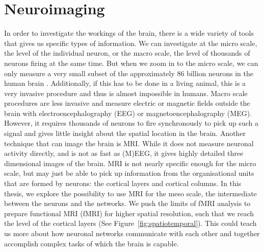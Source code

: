 \section*{Neuroimaging}
In order to investigate the workings of the brain, there is a wide variety of tools that gives us specific types of information. We can investigate at the micro scale, the level of the individual neuron, or the macro scale, the level of thousands of neurons firing at the same time. But when we zoom in to the micro scale, we can only measure a very small subset of the approximately 86 billion neurons in the human brain \cite{Herculano-Houzel2009}. Additionally, if this has to be done in a living animal, this is a very invasive procedure and thus is almost impossible in humans. Macro scale procedures are less invasive and measure electric or magnetic fields outside the brain with electroencephalography (EEG) or magnetoencephalography (MEG). However, it requires thousands of neurons to fire synchronously to pick up such a signal and gives little insight about the spatial location in the brain. Another technique that can image the brain is MRI. While it does not measure neuronal activity directly, and is not as fast as (M)EEG, it gives highly detailed three dimensional images of the brain. MRI is not nearly specific enough for the micro scale, but may just be able to pick up information from the organisational units that are formed by neurons: the cortical layers and cortical columns. In this thesis, we explore the possibility to use MRI for the meso scale, the intermediate between the neurons and the networks. We push the limits of fMRI analysis to prepare functional MRI (fMRI) for higher spatial resolution, such that we reach the level of the cortical layers (See Figure~\ref{fig:spatiotemporal}). This could teach us more about how neuronal networks communicate with each other and together accomplish complex tasks of which the brain is capable. 


